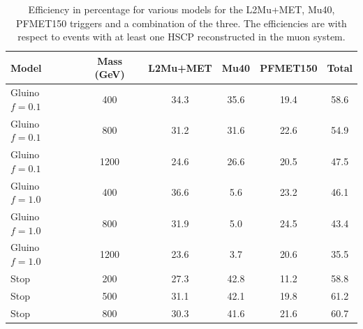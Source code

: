 \begin{table}
 \begin{center}
  \caption[Trigger efficiency for various models considered with respect to events with a reconstructed HSCP in the muon system]
{Efficiency in percentage for various models for the L2Mu+MET, Mu40, PFMET150 triggers and a combination of the three.
The efficiencies are with respect to events with at least one HSCP reconstructed in the muon system.}
     \label{tab:triggEffSA}
  \begin{tabular}{|l|c|c|c|c|c|} \hline
      Model     & Mass (GeV) &L2Mu+MET & Mu40       & PFMET150   & Total   \\ \hline
 Gluino $f=0.1$ &  400       & 34.3    & 35.6       & 19.4       & 58.6    \\
 Gluino $f=0.1$ &  800       & 31.2    & 31.6       & 22.6       & 54.9    \\
 Gluino $f=0.1$ & 1200       & 24.6    & 26.6       & 20.5       & 47.5    \\
 Gluino $f=1.0$ &  400       & 36.6    & 5.6        & 23.2       & 46.1    \\
 Gluino $f=1.0$ &  800       & 31.9    & 5.0        & 24.5       & 43.4    \\
 Gluino $f=1.0$ & 1200       & 23.6    & 3.7        & 20.6       & 35.5    \\
           Stop &  200       & 27.3    & 42.8       & 11.2       & 58.8    \\
           Stop &  500       & 31.1    & 42.1       & 19.8       & 61.2    \\
           Stop &  800       & 30.3    & 41.6       & 21.6       & 60.7    \\ \hline
  \end{tabular}
 \end{center}
\end{table}

